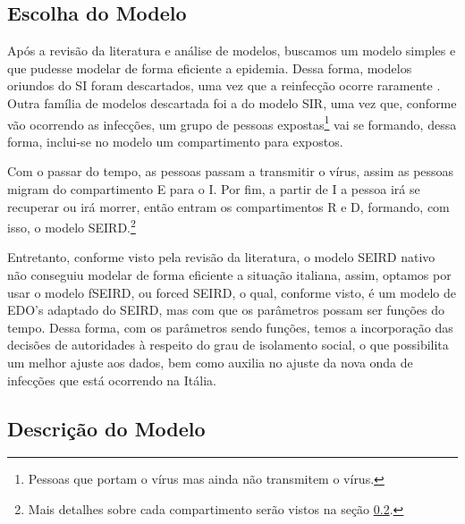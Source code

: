 \documentclass{article}
\begin{document}
\subsection{Escolha do Modelo}

Após a revisão da literatura e análise de modelos, buscamos um modelo simples e que pudesse modelar de forma eficiente a epidemia. Dessa forma, modelos oriundos do SI foram descartados, uma vez que a reinfecção ocorre raramente \cite{again}. Outra família de modelos descartada foi a do modelo SIR, uma vez que, conforme vão ocorrendo as infecções, um grupo de pessoas expostas\footnote{Pessoas que portam o vírus mas ainda não transmitem o vírus.} vai se formando, dessa forma, inclui-se no modelo um compartimento para expostos.

Com o passar do tempo, as pessoas passam a transmitir o vírus, assim as pessoas migram do compartimento E para o I. Por fim, a partir de I a pessoa irá se recuperar ou irá morrer, então entram os compartimentos R e D, formando, com isso, o modelo SEIRD.\footnote{Mais detalhes sobre cada compartimento serão vistos na seção \ref{descrição_do_modelo}.}

Entretanto, conforme visto pela revisão da literatura, o modelo SEIRD nativo não conseguiu modelar de forma eficiente a situação italiana, assim, optamos por usar o modelo fSEIRD, ou forced SEIRD, o qual, conforme visto, é um modelo de EDO's adaptado do SEIRD, mas com que os parâmetros possam ser funções do tempo. Dessa forma, com os parâmetros sendo funções, temos a incorporação das decisões de autoridades à respeito do grau de isolamento social, o que possibilita um melhor ajuste aos dados, bem como auxilia no ajuste da nova onda de infecções que está ocorrendo na Itália.

\subsection{Descrição do Modelo} \label{descrição_do_modelo}
\end{document}
